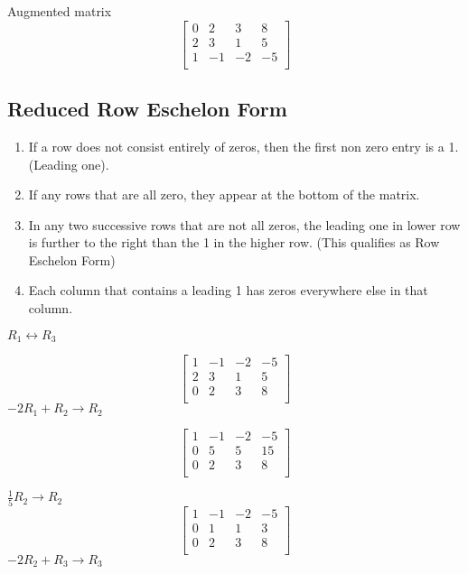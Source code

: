 Augmented matrix
\[	\begin{bmatrix}
	0 & 2 & 3 & 8 \\
	2 & 3 & 1 & 5 \\
	1 & -1 & -2 & -5 \\
\end{bmatrix}
\]

\subsection{Reduced Row Eschelon Form}%
\label{sub:reduced_row_eschelon_form}



\begin{enumerate}
	\item If a row does not consist entirely of zeros, then the first non zero entry is a 1. (Leading one).
	\item If any rows that are all zero, they appear at the bottom of the matrix.
	\item In any two successive rows that are not all zeros, the leading one in lower row is further to the right than
		the 1 in the higher row. (This qualifies as Row Eschelon Form)
	\item Each column that contains a leading 1 has zeros everywhere else in that column.
\end{enumerate}

\begin{solution}[1]

\end{solution}
$R_1\leftrightarrow R_3$

\[	\begin{bmatrix}
	1 & -1 & -2 & -5 \\
	2 & 3 & 1 & 5 \\
	0 & 2 & 3 & 8 \\
\end{bmatrix}
\]
$-2 R_1 + R_2 \to R_2$


\[	\begin{bmatrix}
	1 & -1 & -2 & -5 \\
	0 & 5 & 5 & 15 \\
	0 & 2 & 3 & 8 \\
\end{bmatrix}
\]

$\frac{1}{5}R_2 \to R_2$
\[	\begin{bmatrix}
	1 & -1 & -2 & -5 \\
	0 & 1 & 1 & 3 \\
	0 & 2 & 3 & 8 \\
\end{bmatrix}
\]
$-2 R_2 + R_3 \to R_3$

